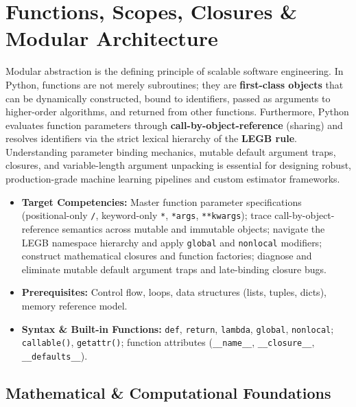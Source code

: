 \chapter{Functions, Scopes, Closures \& Modular Architecture}

Modular abstraction is the defining principle of scalable software engineering. In Python, functions are not merely subroutines; they are \textbf{first-class objects} that can be dynamically constructed, bound to identifiers, passed as arguments to higher-order algorithms, and returned from other functions. Furthermore, Python evaluates function parameters through \textbf{call-by-object-reference} (sharing) and resolves identifiers via the strict lexical hierarchy of the \textbf{LEGB rule}. Understanding parameter binding mechanics, mutable default argument traps, closures, and variable-length argument unpacking is essential for designing robust, production-grade machine learning pipelines and custom estimator frameworks.

\vspace{0.5cm}
\begin{tcolorbox}[colback=primarylight, colframe=primarydark, title={\textbf{Executive Roadmap \& Learning Objectives}}]
\begin{itemize}
    \item \textbf{Target Competencies:} Master function parameter specifications (positional-only \texttt{/}, keyword-only \texttt{*}, \texttt{*args}, \texttt{**kwargs}); trace call-by-object-reference semantics across mutable and immutable objects; navigate the LEGB namespace hierarchy and apply \texttt{global} and \texttt{nonlocal} modifiers; construct mathematical closures and function factories; diagnose and eliminate mutable default argument traps and late-binding closure bugs.
    \item \textbf{Prerequisites:} Control flow, loops, data structures (lists, tuples, dicts), memory reference model.
    \item \textbf{Syntax \& Built-in Functions:} \texttt{def}, \texttt{return}, \texttt{lambda}, \texttt{global}, \texttt{nonlocal}; \texttt{callable()}, \texttt{getattr()}; function attributes (\texttt{\_\_name\_\_}, \texttt{\_\_closure\_\_}, \texttt{\_\_defaults\_\_}).
\end{itemize}
\end{tcolorbox}

\section{Mathematical \& Computational Foundations}

